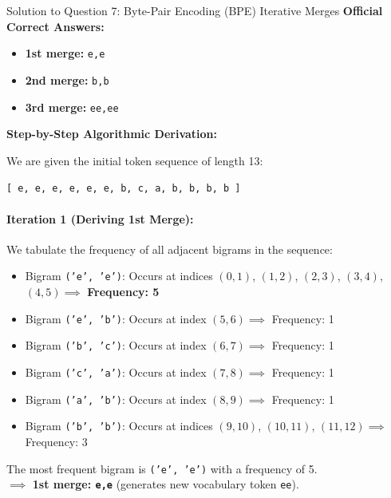 \documentclass[11pt,a4paper]{article}
\begin{document}
\newpage

\begin{solutionbox}{Solution to Question 7: Byte-Pair Encoding (BPE) Iterative Merges}
\textbf{Official Correct Answers:}
\begin{itemize}[leftmargin=2em]
    \item \textbf{1st merge:} \texttt{e,e}
    \item \textbf{2nd merge:} \texttt{b,b}
    \item \textbf{3rd merge:} \texttt{ee,ee}
\end{itemize}

\medskip
\textbf{Step-by-Step Algorithmic Derivation:}

We are given the initial token sequence of length 13:
\begin{center}
\texttt{[ e, e, e, e, e, e, b, c, a, b, b, b, b ]}
\end{center}

\paragraph{Iteration 1 (Deriving 1st Merge):}
We tabulate the frequency of all adjacent bigrams in the sequence:
\begin{itemize}[leftmargin=2em]
    \item Bigram \texttt{('e', 'e')}: Occurs at indices $(0,1)$, $(1,2)$, $(2,3)$, $(3,4)$, $(4,5) \implies$ \textbf{Frequency: 5}
    \item Bigram \texttt{('e', 'b')}: Occurs at index $(5,6) \implies$ Frequency: 1
    \item Bigram \texttt{('b', 'c')}: Occurs at index $(6,7) \implies$ Frequency: 1
    \item Bigram \texttt{('c', 'a')}: Occurs at index $(7,8) \implies$ Frequency: 1
    \item Bigram \texttt{('a', 'b')}: Occurs at index $(8,9) \implies$ Frequency: 1
    \item Bigram \texttt{('b', 'b')}: Occurs at indices $(9,10)$, $(10,11)$, $(11,12) \implies$ Frequency: 3
\end{itemize}
The most frequent bigram is \texttt{('e', 'e')} with a frequency of 5.\\
$\implies$ \textbf{1st merge: \texttt{e,e}} (generates new vocabulary token \texttt{ee}).


\end{solutionbox}
\end{document}
